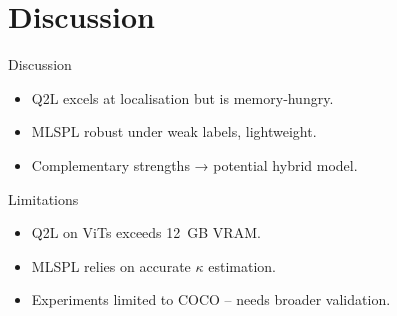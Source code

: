 \section{Discussion}


\begin{frame}{Discussion}
  \begin{itemize}
    \item Q2L excels at localisation but is memory‑hungry.
    \item MLSPL robust under weak labels, lightweight.
    \item Complementary strengths → potential hybrid model.
  \end{itemize}
\end{frame}

\begin{frame}{Limitations}
  \begin{itemize}
    \item Q2L on ViTs exceeds 12 GB VRAM.
    \item MLSPL relies on accurate $\kappa$ estimation.
    \item Experiments limited to COCO – needs broader validation.
  \end{itemize}
\end{frame}
